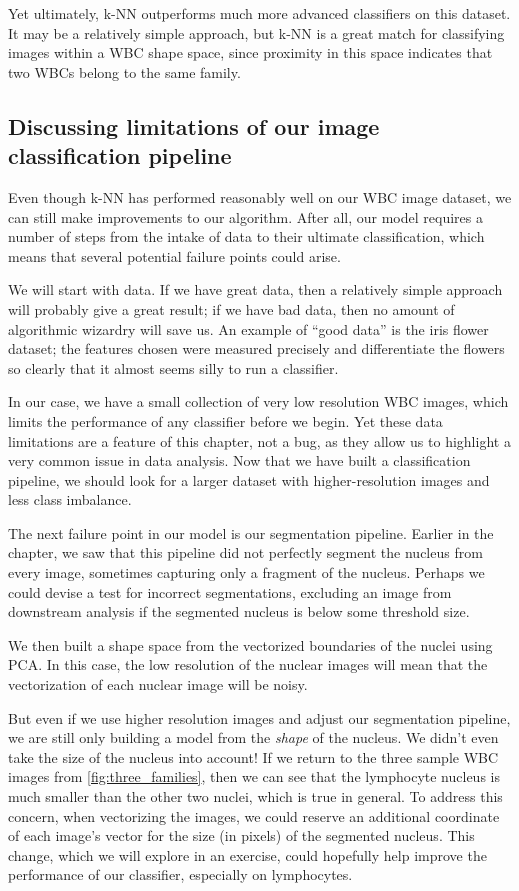 Yet ultimately, k-NN outperforms much more advanced classifiers on this dataset. It may be a relatively simple approach, but k-NN is a great match for classifying images within a WBC shape space, since proximity in this space indicates that two WBCs belong to the same family.

\FloatBarrier
{}
\subsection{Discussing limitations of our image classification pipeline}

Even though k-NN has performed reasonably well on our WBC image dataset, we can still make improvements to our algorithm. After all, our model requires a number of steps from the intake of data to their ultimate classification, which means that several potential failure points could arise.

We will start with data. If we have great data, then a relatively simple approach will probably give a great result; if we have bad data, then no amount of algorithmic wizardry will save us. An example of ``good data'' is the iris flower dataset; the features chosen were measured precisely and differentiate the flowers so clearly that it almost seems silly to run a classifier.

In our case, we have a small collection of very low resolution WBC images, which limits the performance of any classifier before we begin. Yet these data limitations are a feature of this chapter, not a bug, as they allow us to highlight a very common issue in data analysis. Now that we have built a classification pipeline, we should look for a larger dataset with higher-resolution images and less class imbalance.

The next failure point in our model is our segmentation pipeline. Earlier in the chapter, we saw that this pipeline did not perfectly segment the nucleus from every image, sometimes capturing only a fragment of the nucleus. Perhaps we could devise a test for incorrect segmentations, excluding an image from downstream analysis if the segmented nucleus is below some threshold size.

We then built a shape space from the vectorized boundaries of the nuclei using PCA. In this case, the low resolution of the nuclear images will mean that the vectorization of each nuclear image will be noisy.

But even if we use higher resolution images and adjust our segmentation pipeline, we are still only building a model from the \textit{shape} of the nucleus. We didn't even take the size of the nucleus into account! If we return to the three sample WBC images from \autoref{fig:three_families}, then we can see that the lymphocyte nucleus is much smaller than the other two nuclei, which is true in general. To address this concern, when vectorizing the images, we could reserve an additional coordinate of each image's vector for the size (in pixels) of the segmented nucleus. This change, which we will explore in an exercise, could hopefully help improve the performance of our classifier, especially on lymphocytes.\\

